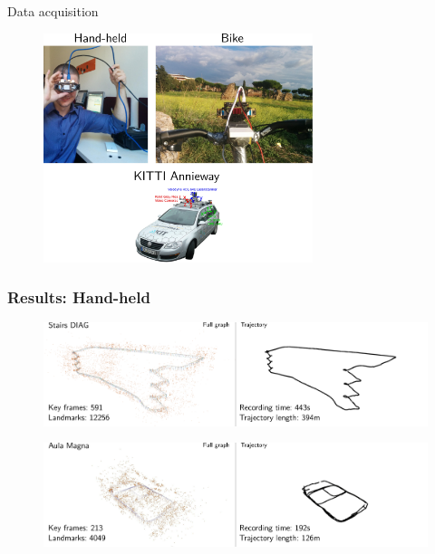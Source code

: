 \documentclass[11pt]{beamer}
\begin{document}
\begin{frame}{Data acquisition
}
\begin{figure}[!htb]
\centering
\includegraphics[width=0.7\textwidth]{figures/results/data_acquisition.pdf}
\end{figure}
\end{frame}

\begin{frame}
\frametitle{Results: Hand-held}
\begin{figure}[!htb]
\centering
\includegraphics[width=\textwidth]{figures/results/stairs_combined.pdf}
\end{figure}
\begin{figure}[!htb]
\centering
\includegraphics[width=\textwidth]{figures/results/aula_magna.pdf}
\end{figure}
\end{frame}
\end{document}
